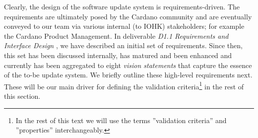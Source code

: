Clearly, the design of the software update system is requirements-driven. The
requirements are ultimately posed by the Cardano community and are eventually
conveyed to our team via various internal (to IOHK) stakeholders; for example
the Cardano Product Management. In deliverable \emph{D1.1 Requirements and
	Interface Design} \cite{priviledge_d11}, we have described an initial set 
	of 
requirements. Since
then, this set has been discussed internally, has matured and been enhanced
and currently has been aggregated to eight \emph{vision statements} that
capture the essence of the to-be update system. We briefly outline these
high-level
requirements next. These will be our main driver for defining the
validation criteria\footnote{In the rest of this text we will use the terms
	''validation criteria'' and ''properties'' interchangeably.} in the rest of
this section.

